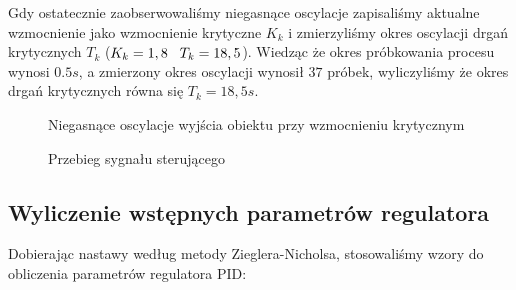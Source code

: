 Gdy ostatecznie zaobserwowaliśmy niegasnące oscylacje zapisaliśmy aktualne wzmocnienie 
jako wzmocnienie krytyczne $K_{k}$ i zmierzyliśmy okres oscylacji drgań 
krytycznych $T_{k}$ ($K_{k} = 1,8 \hspace{0.3 cm} T_{k}=18,5 $). Wiedząc że okres próbkowania procesu 
wynosi $\num{0,5}s$, a zmierzony okres oscylacji wynosił $\num{37}$ próbek, wyliczyliśmy że
okres drgań krytycznych równa się $T_{k}=18,5s$. 

\begin{figure}[t]
    \centering
    \caption{Niegasnące oscylacje wyjścia obiektu przy wzmocnieniu krytycznym}
    \label{zad5_niegasnace_oscylacje}
\end{figure}

\begin{figure}[b]
    \centering
    \caption{Przebieg sygnału sterującego }
    \label{zad5_niegasnace_oscylacje_ster}
\end{figure}
\FloatBarrier

\subsection{Wyliczenie wstępnych parametrów regulatora}
\label{zad5_regulator_zn}
Dobierając nastawy według metody Zieglera-Nicholsa, 
stosowaliśmy wzory do obliczenia parametrów regulatora PID: 

